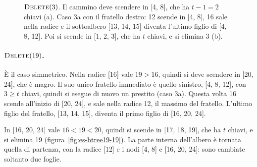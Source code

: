 \begin{figure}[htbp]
\caption{$\textsc{Delete}(3)$. Il cammino deve scendere in [4, 8], che ha $t-1 = 2$ chiavi (a). Caso 3a con il fratello destro: 12 scende in [4, 8], 16 sale nella radice e il sottoalbero [13, 14, 15] diventa l'ultimo figlio di [4, 8, 12]. Poi si scende in [1, 2, 3], che ha $t$ chiavi, e si elimina 3 (b).}
\label{fig:es-btree19-3}
\end{figure}

\paragraph{$\textsc{Delete}(19)$.}
È il caso simmetrico. Nella radice [16] vale $19 > 16$, quindi si deve scendere in [20, 24], che è magro. Il suo unico fratello immediato è quello sinistro, [4, 8, 12], con $3 \ge t$ chiavi, quindi si esegue di nuovo un prestito (caso 3a). Questa volta 16 scende all'inizio di [20, 24], e sale nella radice 12, il massimo del fratello. L'ultimo figlio del fratello, [13, 14, 15], diventa il primo figlio di [16, 20, 24].

In [16, 20, 24] vale $16 < 19 < 20$, quindi si scende in [17, 18, 19], che ha $t$ chiavi, e si elimina 19 (figura~\ref{fig:es-btree19-19}). La parte interna dell'albero è tornata quella di partenza, con la radice [12] e i nodi [4, 8] e [16, 20, 24]: sono cambiate soltanto due foglie.

